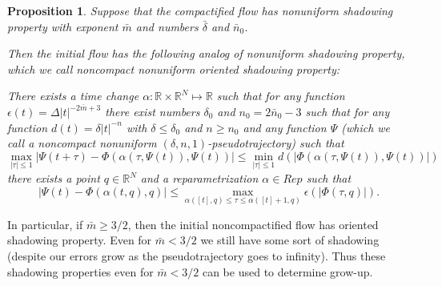 \documentclass[11pt]{article}
\newcounter{razdel}[section]
\theoremstyle{Mystyle}
\newtheorem{Proposition}[razdel]{Proposition}
\begin{document}
\begin{Proposition}
\label{PropB}
Suppose that the compactified flow has nonuniform shadowing property with exponent $\bar{m}$ and numbers $\bar{\delta}$ and $\bar{n}_0$.

Then the initial flow has the following analog of nonuniform shadowing property, which we call \textit{noncompact nonuniform oriented shadowing property}:

There exists a time change $\alpha:\mathbb{R}\times \mathbb{R}^N\mapsto\mathbb{R}$ such that for any function 
$\epsilon(t) = \Delta |t|^{-2\bar{m}+3}$ there exist numbers $\delta_0$ and $n_0=2\bar{n}_0-3$ such that %
for any function
$d(t)=\delta|t|^{-n}$ with $\delta\leq\delta_0$ and $n\geq n_0$ 
and any function $\Psi$ (which we call a \textit{noncompact nonuniform $(\delta,n,1)$-pseudotrajectory}) such that
$$\max_{|\tau|\leq 1}|\Psi(t+\tau) - \Phi(\alpha(\tau,\Psi(t)),\Psi(t))|\leq \min_{|\tau|\leq 1}d(|\Phi(\alpha(\tau,\Psi(t)),\Psi(t))|)$$
there exists a point $q\in\mathbb{R}^{N}$ and a reparametrization $\alpha\in Rep$ 
such that
$$|\Psi(t) - \Phi(\alpha(t,q),q)|\leq \max_{\alpha([t],q)\leq \tau\leq \alpha([t]+1,q)}\epsilon(|\Phi(\tau,q)|).$$
\end{Proposition}


In particular, if $\bar{m}\geq 3/2$, then the initial noncompactified flow has oriented shadowing property. Even for $\bar{m}<3/2$ we still have some sort of shadowing (despite our errors grow as the pseudotrajectory goes to infinity). Thus these shadowing properties even for $\bar{m}<3/2$ can be used to determine grow-up.
\end{document}
